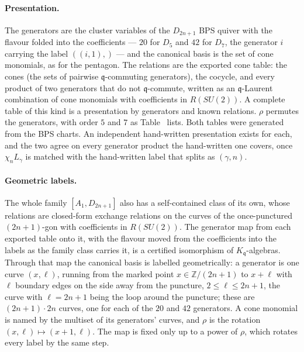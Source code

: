 \documentclass[11pt]{amsart}
\makeatletter
\newcommand\fq{\mathfrak{q}}
\newcommand\bZ{\mathbb{Z}}
\theoremstyle{remark}
\newcommand{\pref}[1]{\@ifundefined{r@P-#1}{\textup{[\texttt{\detokenize{#1}}]}}{\ref{P-#1}}}
\makeatother
\begin{document}
\paragraph{Presentation.}  The generators are the cluster variables of the
$D_{2n+1}$ BPS quiver with the flavour folded into the coefficients --- $20$
for $D_5$ and $42$ for $D_7$, the generator $i$ carrying the label
$((i,1),)$ --- and the canonical basis is the set of cone monomials, as for
the pentagon.  The relations are the exported cone table: the cones (the
sets of pairwise $\fq$-commuting generators), the cocycle, and every product
of two generators that do not $\fq$-commute, written as an $\fq$-Laurent
combination of cone monomials with coefficients in $R(SU(2))$.  A complete
table of this kind is a presentation by generators and known relations.  $\rho$ permutes the generators, with
order $5$ and $7$ as Table~\pref{tab:finite_type} lists.  Both tables were
generated from the BPS charts.  An independent hand-written presentation
exists for each, and the two agree on every generator product the
hand-written one covers, once $\chi_nL_\gamma$ is matched with the
hand-written label that splits as $(\gamma,n)$.

\paragraph{Geometric labels.}  The whole family $[A_1,D_{2n+1}]$ also has a
self-contained class of its own, whose relations are closed-form exchange
relations on the curves of the once-punctured $(2n+1)$-gon with
coefficients in $R(SU(2))$.  The generator map from each exported table onto
it, with the flavour moved from the coefficients into the labels as the
family class carries it, is a certified isomorphism of $K_\fq$-algebras.
Through that map the canonical basis is labelled geometrically: a generator
is one curve $(x,\ell)$, running from the marked point $x\in\bZ/(2n+1)$ to
$x+\ell$ with $\ell$ boundary edges on the side away from the puncture,
$2\le\ell\le 2n+1$, the curve with $\ell=2n+1$ being the loop around the
puncture; these are $(2n+1)\cdot 2n$ curves, one for each of the $20$ and
$42$ generators.  A cone monomial is named by the multiset of its
generators' curves, and $\rho$ is the rotation $(x,\ell)\mapsto(x+1,\ell)$.
The map is fixed only up to a power of $\rho$, which rotates every label by
the same step.
\end{document}
